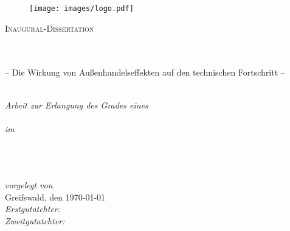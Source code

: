 \documentclass[
10pt, %
twoside, %
chapterinoneline,%
onehalfspacing, %
nolistspacing, %
parskip, %
headsepline, %
ngerman
]{MastersDoctoralThesis} %
\author{Birgit Kirschbaum} %
\date{\today}
\newcommand{\tilt}[1]{\textit{#1}}
\begin{document}
\frontmatter %

\pagestyle{plain} %


\begin{titlepage}
	
	\begin{figure}[h]
		\centering
		\texttt{[image: images/logo.pdf]} %
	\end{figure}
	
	\begin{center}
		
		{\scshape\LARGE \univname\par}\vspace{1.0cm} %
		\textsc{\Large Inaugural-Dissertation}\\[0.5cm] %
		
		\HRule \\[0.4cm] %
		{\huge \bfseries \ttitle}\\[0.3cm]
		{-- Die Wirkung von Außenhandelseffekten auf den technischen Fortschritt --\par}\vspace{0.25cm} %
		\HRule \\[1.2cm] %
				
		\large \textit{Arbeit zur Erlangung des Grades eines}\\ \degreename\\[0.3cm] %
		\textit{im}\\[0.4cm]
		\groupname\\[0.5cm] \deptname\\[0.5cm] %
		\facname \\[1.3cm]
		
	\end{center}
	
		\begin{flushleft} \large
			\tilt{vorgelegt von }\authorname \\ %
			Greifswald, den \today \\[1cm]
			\tilt{Erstgutatchter: }\supname \\ %
			\tilt{Zweitgutatchter: } \examname %
		\end{flushleft}
	
\end{titlepage}
\end{document}

